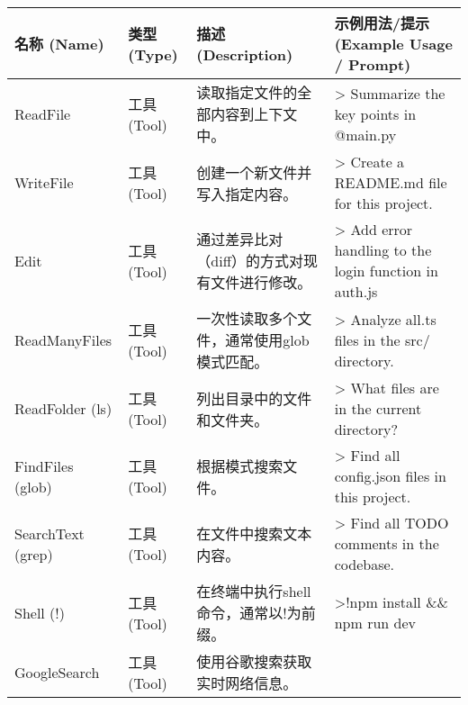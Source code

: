 \documentclass[a4paper,12pt]{article}
\begin{document}
\begin{multicols}{2}
    \begin{longtable}[]{@{}
      >{\raggedright\arraybackslash}p{}
      >{\raggedright\arraybackslash}p{}
      >{\raggedright\arraybackslash}p{}
      >{\raggedright\arraybackslash}p{}@{}}
    \toprule\noalign{}
    \begin{minipage}[b]{\linewidth}\raggedright
    名称 (Name)
    \end{minipage} & \begin{minipage}[b]{\linewidth}\raggedright
    类型 (Type)
    \end{minipage} & \begin{minipage}[b]{\linewidth}\raggedright
    描述 (Description)
    \end{minipage} & \begin{minipage}[b]{\linewidth}\raggedright
    示例用法/提示 (Example Usage / Prompt)
    \end{minipage} \\
    \midrule\noalign{}
    \endhead
    \bottomrule\noalign{}
    \endlastfoot
    ReadFile & 工具 (Tool) & 读取指定文件的全部内容到上下文中。 &
    \textgreater{} Summarize the key points in @main.py \\
    WriteFile & 工具 (Tool) & 创建一个新文件并写入指定内容。 &
    \textgreater{} Create a README.md file for this project. \\
    Edit & 工具 (Tool) & 通过差异比对（diff）的方式对现有文件进行修改。
    & \textgreater{} Add error handling to the login function in
    auth.js \\
    ReadManyFiles & 工具 (Tool) &
    一次性读取多个文件，通常使用glob模式匹配。 & \textgreater{} Analyze
    all.ts files in the src/ directory. \\
    ReadFolder (ls) & 工具 (Tool) & 列出目录中的文件和文件夹。 &
    \textgreater{} What files are in the current directory? \\
    FindFiles (glob) & 工具 (Tool) & 根据模式搜索文件。 & \textgreater{}
    Find all config.json files in this project. \\
    SearchText (grep) & 工具 (Tool) & 在文件中搜索文本内容。 &
    \textgreater{} Find all TODO comments in the codebase. \\
    Shell (!) & 工具 (Tool) & 在终端中执行shell命令，通常以!为前缀。 &
    \textgreater!npm install \&\& npm run dev \\
    GoogleSearch & 工具 (Tool) & 使用谷歌搜索获取实时网络信息。 &

\end{longtable}
\end{multicols}
\end{document}
